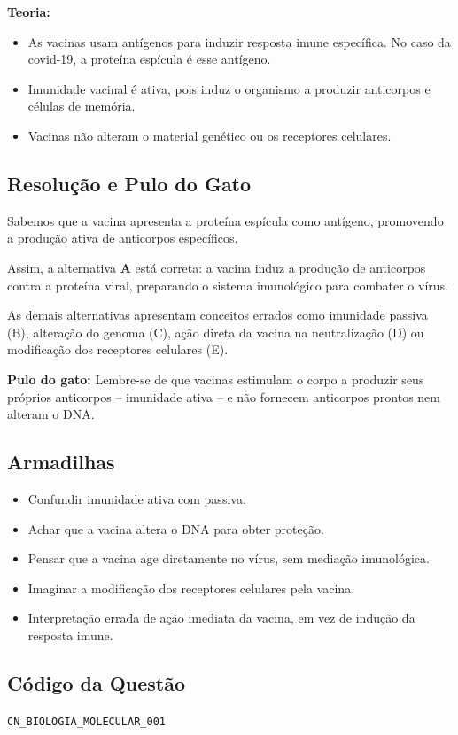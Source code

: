 \documentclass{article}
\begin{document}
\textbf{Teoria:}
\begin{itemize}
  \item As vacinas usam antígenos para induzir resposta imune específica. No caso da covid-19, a proteína espícula é esse antígeno.
  \item Imunidade vacinal é ativa, pois induz o organismo a produzir anticorpos e células de memória.
  \item Vacinas não alteram o material genético ou os receptores celulares.
\end{itemize}

\subsection*{Resolução e Pulo do Gato}

Sabemos que a vacina apresenta a proteína espícula como antígeno, promovendo a produção ativa de anticorpos específicos.

Assim, a alternativa \textbf{A} está correta: a vacina induz a produção de anticorpos contra a proteína viral, preparando o sistema imunológico para combater o vírus.

As demais alternativas apresentam conceitos errados como imunidade passiva (B), alteração do genoma (C), ação direta da vacina na neutralização (D) ou modificação dos receptores celulares (E).

\textbf{Pulo do gato:} Lembre-se de que vacinas estimulam o corpo a produzir seus próprios anticorpos – imunidade ativa – e não fornecem anticorpos prontos nem alteram o DNA.

\subsection*{Armadilhas}

\begin{itemize}
  \item Confundir imunidade ativa com passiva.
  \item Achar que a vacina altera o DNA para obter proteção.
  \item Pensar que a vacina age diretamente no vírus, sem mediação imunológica.
  \item Imaginar a modificação dos receptores celulares pela vacina.
  \item Interpretação errada de ação imediata da vacina, em vez de indução da resposta imune.
\end{itemize}

\subsection*{Código da Questão}

\texttt{CN\_BIOLOGIA\_MOLECULAR\_001}

\clearpage
\end{document}

